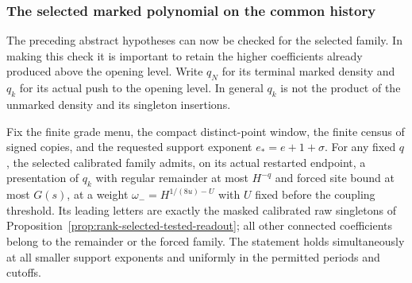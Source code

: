 \subsubsection{The selected marked polynomial on the common history}

The preceding abstract hypotheses can now be checked for the selected
family. In making this check it is important to retain the higher
coefficients already produced above the opening level. Write $q_N$ for
its terminal marked density and $q_k$ for its actual push to the opening
level. In general $q_k$ is not the product of the unmarked density and
its singleton insertions.

\begin{lemma}
\label{lem:allarity-selected-opening}
Fix the finite grade menu, the compact distinct-point window, the
finite census of signed copies, and the requested support exponent
$e_*=e+1+\sigma$. For any fixed $q$, the selected calibrated family
admits, on its actual restarted endpoint, a presentation of $q_k$ with
regular remainder at most $H^{-q}$ and forced site bound at most $G(s)$,
at a weight $\omega_-=H^{1/(8u)-U}$ with $U$ fixed before the coupling
threshold. Its leading letters are exactly the masked calibrated raw
singletons of Proposition~\ref{prop:rank-selected-tested-readout}; all
other connected coefficients belong to the remainder or the forced
family. The statement holds simultaneously at all smaller support
exponents and uniformly in the permitted periods and cutoffs.
\end{lemma}
